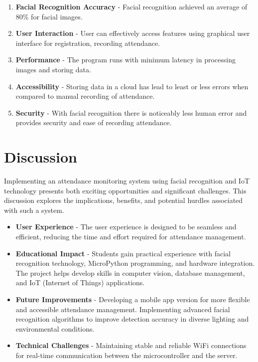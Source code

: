 \documentclass[12pt,a4paper]{report}
\begin{document}
\begin{enumerate}
	\item \textbf{Facial Recognition Accuracy} - Facial recognition achieved an average of 80\% for facial images.
	\item \textbf{User Interaction} - User can effectively access features using graphical user interface for registration, recording attendance.
	\item \textbf{Performance} - The program runs with minimum latency in processing images and storing data.
	\item \textbf{Accessibility} - Storing data in a cloud has lead to least or less errors when compared to manual recording of attendance.
	\item \textbf{Security} - With facial recognition there is noticeably less human error and provides security and ease of recording attendance.
\end{enumerate}

\section{Discussion}
\par Implementing an attendance monitoring system using facial recognition and IoT technology presents both exciting opportunities and significant challenges. This discussion explores the implications, benefits, and potential hurdles associated with such a system.

\begin{itemize}
	\item \textbf{User Experience} - The user experience is designed to be seamless and efficient, reducing the time and effort required for attendance management.
	\item \textbf{Educational Impact} - Students gain practical experience with facial recognition technology, MicroPython programming, and hardware integration. The project helps develop skills in computer vision, database management, and IoT (Internet of Things) applications.
	\item \textbf{Future Improvements} - Developing a mobile app version for more flexible and accessible attendance management. Implementing advanced facial recognition algorithms to improve detection accuracy in diverse lighting and environmental conditions.
	\item \textbf{Technical Challenges} - Maintaining stable and reliable WiFi connections for real-time communication between the microcontroller and the server.
\end{itemize}
\end{document}

